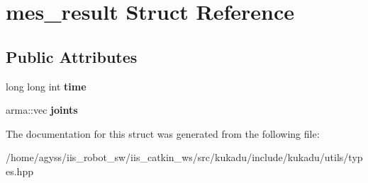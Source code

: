 \hypertarget{structmes__result}{}\section{mes\+\_\+result Struct Reference}
\label{structmes__result}
\subsection*{Public Attributes}
\begin{DoxyCompactItemize}
\item 
long long int {\bfseries time}\hypertarget{structmes__result_a4d4ba46b024ea0aa0009eaaedd028adb}{}\label{structmes__result_a4d4ba46b024ea0aa0009eaaedd028adb}

\item 
arma\+::vec {\bfseries joints}\hypertarget{structmes__result_a8b2d0bedd83bd814cd5f5810f40e5340}{}\label{structmes__result_a8b2d0bedd83bd814cd5f5810f40e5340}

\end{DoxyCompactItemize}


The documentation for this struct was generated from the following file\+:\begin{DoxyCompactItemize}
\item 
/home/agyss/iis\+\_\+robot\+\_\+sw/iis\+\_\+catkin\+\_\+ws/src/kukadu/include/kukadu/utils/types.\+hpp\end{DoxyCompactItemize}
